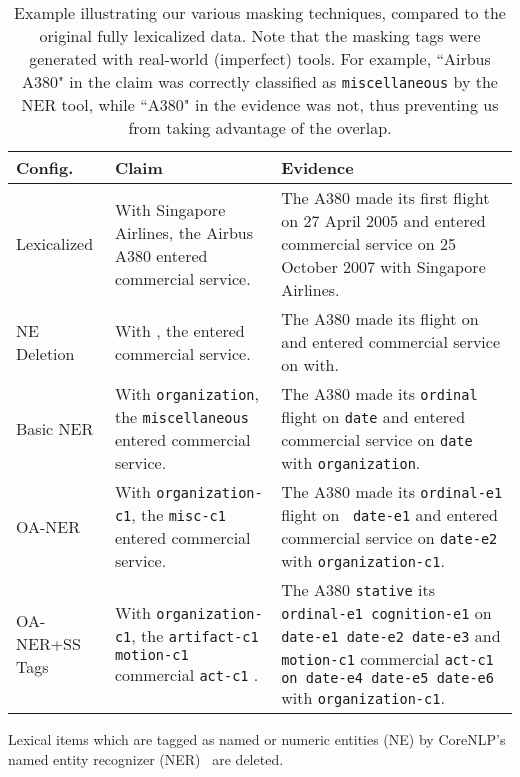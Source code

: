 \documentclass[11pt,a4paper]{article}
\begin{document}
\begin{table*}[t]
\begin{center}
\begin{tabular}{p{20mm}|p{55mm}|p{70mm}}

\textbf{Config.} & \textbf{Claim}& \textbf{Evidence} \\ \hline
Lexicalized & {With Singapore Airlines, the Airbus A380 entered commercial service.} & {The A380 made its first flight on 27 April 2005 and entered commercial service on 25 October 2007 with Singapore Airlines.}\\
\hline 
NE Deletion & {With  , the  entered commercial service.} & {The A380 made its  flight on  and entered commercial service on  with.}\\
\hline 
Basic NER  & {With \texttt{organization}, the \texttt{miscellaneous} entered commercial service.} & {The A380 made its \texttt{ordinal} flight on \texttt{date} and entered commercial service on \texttt{date} with \texttt{organization}.}\\
\hline 
OA-NER  & {With \texttt{organization-c1}, the \texttt{misc-c1} entered commercial service.} & {The A380 made its \texttt{ordinal-e1} flight on \texttt{ date-e1} and entered commercial service on \texttt{date-e2} with \texttt{organization-c1}.}\\
\hline 

\mbox{OA-NER+SS} Tags & {With \texttt{organization-c1}, the \texttt{artifact-c1} \texttt{motion-c1} commercial \texttt{act-c1} .} & {The A380 \texttt{stative} its \texttt{ordinal-e1 cognition-e1} on \texttt{date-e1 date-e2 date-e3} and \texttt{motion-c1} commercial \texttt{act-c1 on date-e4 date-e5 date-e6} with \texttt{organization-c1}.  
}\\

\end{tabular}
\end{center}

    \caption{ Example illustrating our various masking techniques, compared to the original fully lexicalized data. Note that the masking tags were generated with real-world (imperfect) tools. For example, ``Airbus A380" in the claim was correctly classified as \texttt{miscellaneous} by the NER tool, while ``A380" in the evidence was not, thus preventing us from taking advantage of the overlap. }
    \label{masking_examples}
\end{table*}

{}
Lexical items which are tagged as named or numeric entities (NE) by CoreNLP's named entity recognizer (NER)~\citep{manning2014stanford} are deleted.  
\end{document}
